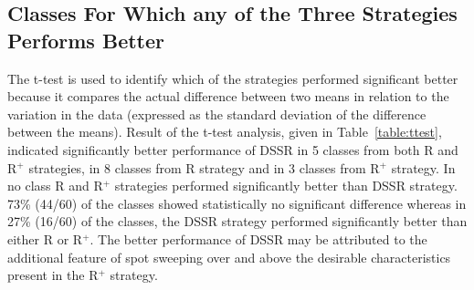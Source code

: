 \subsection{Classes For Which any of the Three Strategies Performs Better}
The t-test is used to identify which of the strategies performed significant better because it compares the actual difference between two means in relation to the variation in the data (expressed as the standard deviation of the difference between the means). Result of the t-test analysis, given in Table~\ref{table:ttest}, indicated significantly better performance of DSSR in 5 classes from both R and R$^+$ strategies, in 8 classes from R strategy and in 3 classes from R$^+$ strategy. In no class R and R$^+$ strategies performed significantly better than DSSR strategy. 73\% (44/60) of the classes showed statistically no significant difference whereas in 27\% (16/60) of the classes, the DSSR strategy performed significantly better than either R or R$^+$. The better performance of DSSR may be attributed to the additional feature of spot sweeping over and above the desirable characteristics present in the R$^+$ strategy. 




